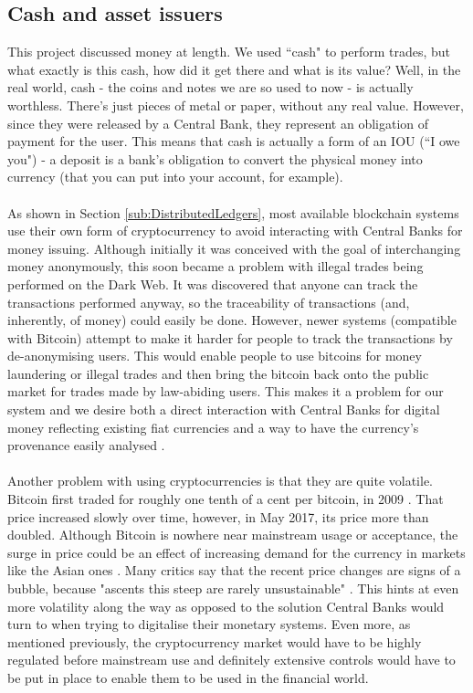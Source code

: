 \documentclass[12pt,twoside]{article}
\begin{document}
\subsection{Cash and asset issuers}
\label{sub:cashissuers}
This project discussed money at length. We used ``cash" to perform trades, but what exactly is this cash, how did it get there and what is its value? Well, in the real world, cash - the coins and notes we are so used to now - is actually worthless. There's just pieces of metal or paper, without any real value. However, since they were released by a Central Bank, they represent an obligation of payment for the user. This means that cash is actually a form of an IOU (``I owe you") - a deposit is a bank's obligation to convert the physical money into currency (that you can put into your account, for example).
\\ \\
As shown in Section \ref{sub:DistributedLedgers}, most available blockchain systems use their own form of cryptocurrency to avoid interacting with Central Banks for money issuing. Although initially it was conceived with the goal of interchanging money anonymously, this soon became a problem with illegal trades being performed on the Dark Web. It was discovered that anyone can track the transactions performed anyway, so the traceability of transactions (and, inherently, of money) could easily be done. However, newer systems (compatible with Bitcoin) attempt to make it harder for people to track the transactions by de-anonymising users. This would enable people to use bitcoins for money laundering or illegal trades and then bring the bitcoin back onto the public market for trades made by law-abiding users. This makes it a problem for our system and we desire both a direct interaction with Central Banks for digital money reflecting existing fiat currencies and a way to have the currency's provenance easily analysed \cite{tumblebit}.
\\ \\
Another problem with using cryptocurrencies is that they are quite volatile. Bitcoin first traded for roughly one tenth of a cent per bitcoin, in 2009 \cite{first}. That price increased slowly over time, however, in May 2017, its price more than doubled. Although Bitcoin is nowhere near mainstream usage or acceptance, the surge in price could be an effect of increasing demand for the currency in markets like the Asian ones \cite{voxbubble}. Many critics say that the recent price changes are signs of a bubble, because "ascents this steep are rarely unsustainable" \cite{bubble}. This hints at even more volatility along the way as opposed to the solution Central Banks would turn to when trying to digitalise their monetary systems. Even more, as mentioned previously, the cryptocurrency market would have to be highly regulated before mainstream use and definitely extensive controls would have to be put in place to enable them to be used in the financial world.
\end{document}
